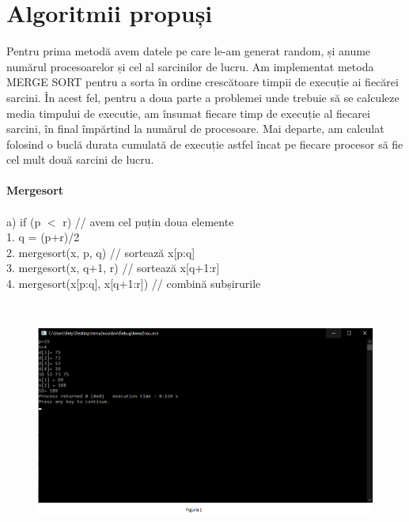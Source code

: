 \documentclass{article}
\begin{document}
\section{Algoritmii propuși}
\vspace{1cm}
Pentru prima metodă avem datele pe care le-am generat random, și anume numărul procesoarelor și cel al sarcinilor de lucru. Am implementat metoda MERGE SORT pentru a sorta în ordine crescătoare timpii de execuție ai fiecărei sarcini. În acest fel, pentru a doua parte a problemei unde trebuie să se  calculeze media timpului de executie,  am însumat fiecare timp de execuție al fiecarei sarcini, în final împărtind la numărul de procesoare. Mai departe, am calculat folosind o buclă durata cumulată de execuție astfel încat pe fiecare procesor să fie cel mult două sarcini de lucru. \\
\\
\hspace{1cm} \textbf{Mergesort} \\
\\
a) if (p $<$ r) \hspace{1.7cm} // avem cel puțin doua elemente \\
1. q = (p+r)/2 \\
2. mergesort(x, p, q)\hspace{1cm} // sortează x[p:q] \\ 
3. mergesort(x, q+1, r)\hspace{1cm} // sortează x[q+1:r] \\
4. mergesort(x[p:q], x[q+1:r])\hspace{1cm} // combină subșirurile \\

\begin{figure}[htp]
\centering
\includegraphics[width=15cm,height=8cm]{figura1}
\end{figure}
  
\end{document}
